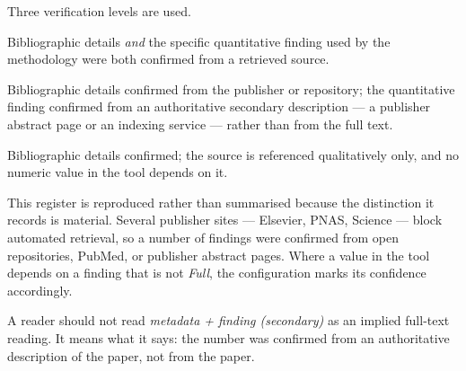 Three verification levels are used.

\begin{description}[leftmargin=1.5em, style=sameline, font=\normalfont\itshape]
  \item[Full] Bibliographic details \emph{and} the specific quantitative
  finding used by the methodology were both confirmed from a retrieved source.
  \item[Metadata + finding (secondary)] Bibliographic details confirmed from
  the publisher or repository; the quantitative finding confirmed from an
  authoritative secondary description --- a publisher abstract page or an
  indexing service --- rather than from the full text.
  \item[Metadata only] Bibliographic details confirmed; the source is
  referenced qualitatively only, and no numeric value in the tool depends on
  it.
\end{description}

\begin{keynote}
\noindent This register is reproduced rather than summarised because the
distinction it records is material. Several publisher sites --- Elsevier, PNAS,
Science --- block automated retrieval, so a number of findings were confirmed
from open repositories, PubMed, or publisher abstract pages. Where a value in
the tool depends on a finding that is not \emph{Full}, the configuration marks
its confidence accordingly.

A reader should not read \emph{metadata + finding (secondary)} as an implied
full-text reading. It means what it says: the number was confirmed from an
authoritative description of the paper, not from the paper.
\end{keynote}

